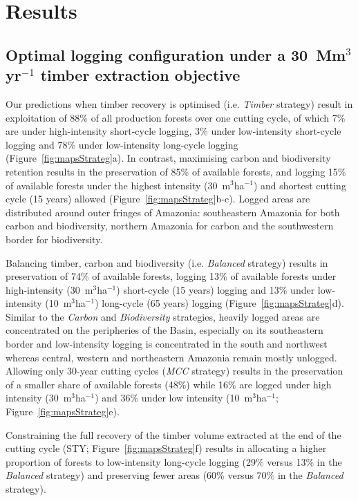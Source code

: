\documentclass[12pt]{article}
\begin{document}
\section*{Results}

\subsection*{Optimal logging configuration under a 30~Mm$^3$yr$^{-1}$ timber extraction objective}

Our predictions when timber recovery is optimised (i.e. \textit{Timber} strategy) result in exploitation of 88\% of all production forests over one cutting cycle, of which 7\% are under high-intensity short-cycle logging, 3\% under low-intensity short-cycle logging and 78\% under low-intensity long-cycle logging (Figure~\ref{fig:mapsStrateg}a). In contrast, maximising carbon and biodiversity retention results in the preservation of 85\% of available forests, and logging 15\% of available forests under the highest intensity (30~m$^3$ha$^{-1}$) and shortest cutting cycle (15 years) allowed (Figure~\ref{fig:mapsStrateg}b-c). Logged areas are distributed around outer fringes of Amazonia: southeastern Amazonia for both carbon and biodiversity, northern Amazonia for carbon and the southwestern border for biodiversity. 

Balancing timber, carbon and biodiversity (i.e. \textit{Balanced} strategy) results in preservation of 74\% of available forests, logging 13\% of available forests under high-intensity (30~m$^3$ha$^{-1}$) short-cycle (15 years) logging and 13\% under low-intensity (10~m$^3$ha$^{-1}$) long-cycle (65 years) logging (Figure~\ref{fig:mapsStrateg}d). Similar to the \textit{Carbon} and \textit{Biodiversity} strategies, heavily logged areas are concentrated on the peripheries of the Basin, especially on its southeastern border and low-intensity logging is concentrated in the south and northwest whereas central, western and northeastern Amazonia remain mostly unlogged. Allowing only 30-year cutting cycles (\textit{MCC} strategy) results in the preservation of a smaller share of available forests (48\%) while 16\% are logged under high intensity (30~m$^3$ha$^{-1}$) and 36\% under low intensity (10~m$^3$ha$^{-1}$;  Figure~\ref{fig:mapsStrateg}e). 

Constraining the full recovery of the timber volume extracted at the end of the cutting cycle (STY; Figure~\ref{fig:mapsStrateg}f) results in allocating a higher proportion of forests to low-intensity long-cycle logging (29\% versus 13\% in the \textit{Balanced} strategy) and preserving fewer areas (60\% versus 70\% in the \textit{Balanced} strategy).
\end{document}
